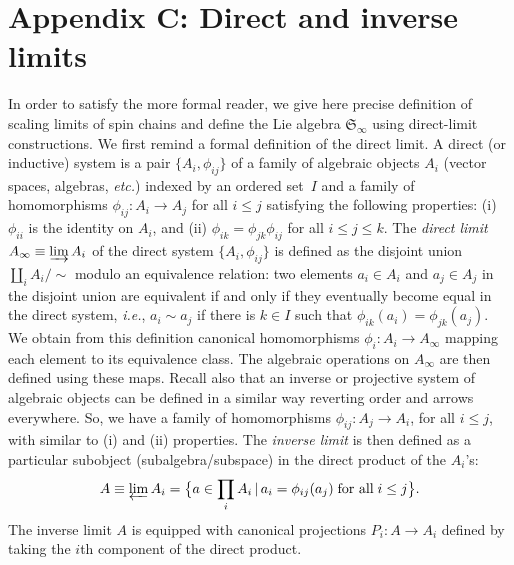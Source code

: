 \documentclass[11pt]{article}
\renewcommand{\theequation}{\thesection.\arabic{equation}}
\newcommand{\proj}{P}
\newcommand{\interLie}{\mathfrak{S}}
\newcommand{\interinfin}{\interLie_{\infty}}
\theoremstyle{definition}
\begin{document}
\section*{Appendix C: Direct and inverse limits}\label{sec:direct-lim}
\renewcommand\thesection{C}
\renewcommand{\theequation}{C\arabic{equation}}
\setcounter{equation}{0}


In order to satisfy the more formal reader, we give here precise definition of scaling limits of spin chains and define the Lie algebra $\interinfin$ using direct-limit constructions. We first remind  a formal definition of the direct limit. A direct (or inductive) system is a pair $\{A_i,\phi_{ij}\}$ of a family of algebraic objects $A_i$ (vector spaces, algebras, {\it etc.}) indexed by an ordered set~$I$ and a family of homomorphisms $\phi_{ij}:A_i\rightarrow A_j$ for all $i\leq j$ satisfying the following properties: (i) $\phi_{ii}$ is the identity on $A_i$, and (ii) $\phi_{ik}=\phi_{jk} \phi_{ij}$ for all $i\leq j\leq k$. The \textit{direct limit} $A_{\infty}\equiv\varinjlim A_i$ of the direct system $\{A_i,\phi_{ij}\}$ is defined as the disjoint union $\coprod_i A_i/\sim$ modulo an equivalence relation:
two elements $a_i\in A_i$ and $a_j\in A_j$ in the disjoint union are equivalent if and only if they eventually become equal in the direct system, {\it i.e.}, $a_i \sim a_j$ if there is $k\in I$ such that $\phi_{ik}(a_i)=\phi_{jk}(a_j)$. We obtain from this definition canonical homomorphisms $\phi_i: A_i\rightarrow A_{\infty}$ mapping each element to its equivalence class. The algebraic operations on $A_{\infty}$ are then defined  using these maps.
Recall also that an inverse or projective system of algebraic objects  can be defined in a similar way reverting order and arrows everywhere. So, we  have a family of homomorphisms $\phi_{ij}:A_j\rightarrow A_i$, for all $i\leq j$, with similar to (i) and (ii) properties.
The \textit{inverse limit} is then defined as a particular subobject (subalgebra/subspace) in the direct product of the $A_i$'s:
\begin{equation}\label{eq:inv-lim-def}
A\equiv \varprojlim A_i = \bigl\{a\in\prod_i A_i \, | \, a_i = \phi_{ij}(a_j) \; \text{for all}\; i\leq j\bigr\}.
\end{equation}
The inverse limit $A$ is equipped with canonical projections $\proj_i:A\to A_i$ defined by taking the $i$th component of the direct product.
\end{document}
